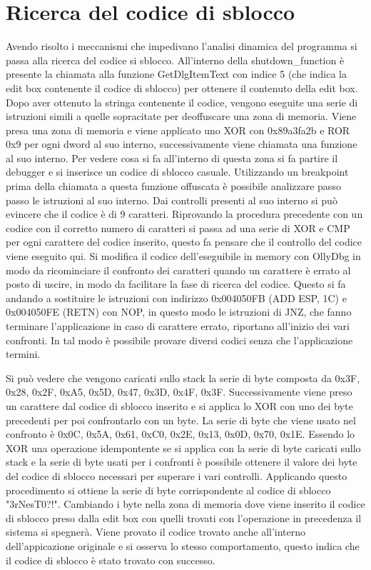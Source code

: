 \documentclass[a4paper,12pt]{article}
\begin{document}
\section{Ricerca del codice di sblocco}
Avendo risolto i meccanismi che impedivano l'analisi dinamica del programma si passa alla ricerca del codice si sblocco. All'interno della shutdown\_function è presente la chiamata alla funzione GetDlgItemText con indice 5 (che indica la edit box contenente il codice di sblocco) per ottenere il contenuto della edit box. Dopo aver ottenuto la stringa  contenente il codice, vengono eseguite una serie di istruzioni simili a quelle sopracitate per deoffuscare una zona di memoria. Viene presa una zona di memoria e viene applicato uno XOR con 0x89a3fa2b e ROR 0x9 per ogni dword al suo interno, successivamente viene chiamata una funzione al suo interno. Per vedere cosa si fa all'interno di questa zona si fa partire il debugger e si inserisce un codice di sblocco casuale. Utilizzando un breakpoint prima della chiamata a questa funzione offuscata è possibile analizzare passo passo le istruzioni al suo interno. Dai controlli presenti al suo interno si può evincere che il codice è di 9 caratteri. Riprovando la procedura precedente con un codice con il corretto numero di caratteri si passa ad una serie di XOR e CMP per ogni carattere del codice inserito, questo fa pensare che il controllo del codice viene eseguito qui. Si modifica il codice dell'eseguibile in memory con OllyDbg in modo da ricominciare il confronto dei caratteri quando un carattere è errato al posto di uscire, in modo da facilitare la fase di ricerca del codice.  Questo si fa andando a sostituire le istruzioni con indirizzo 0x004050FB (ADD ESP, 1C) e 0x004050FE (RETN) con NOP, in questo modo le istruzioni di JNZ, che fanno terminare l'applicazione in caso di carattere errato, riportano all'inizio dei vari confronti.
In tal modo è possibile provare diversi codici senza che l'applicazione termini. 

Si può vedere che vengono caricati sullo stack la serie di byte composta da 0x3F, 0x28, 0x2F, 0xA5, 0x5D, 0x47, 0x3D, 0x4F, 0x3F. Successivamente viene preso un carattere dal codice di sblocco inserito e si applica lo XOR con uno dei byte precedenti per poi confrontarlo con un byte. La serie di byte che viene usato nel confronto è 0x0C, 0x5A, 0x61, 0xC0, 0x2E, 0x13, 0x0D, 0x70, 0x1E. Essendo lo XOR una operazione idempontente se si applica con la serie di byte caricati sullo stack e la serie di byte usati per i confronti è possibile ottenere il valore dei byte del codice di sblocco necessari per superare i vari controlli. Applicando questo procedimento si ottiene la serie di byte corrispondente al codice di sblocco "3rNesT0?!". Cambiando i byte nella zona di memoria dove viene inserito il codice di sblocco preso dalla edit box con quelli trovati con l'operazione in precedenza il sistema si spegnerà. Viene provato il codice trovato anche all'interno dell'appicazione originale e si osserva lo stesso comportamento, questo indica che il codice di sblocco è stato trovato con successo. 
\end{document}
